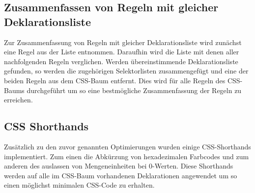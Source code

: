\subsection{Zusammenfassen von Regeln mit gleicher Deklarationsliste}
Zur Zusammenfassung von Regeln mit gleicher Deklarationsliste wird zunächst eine Regel aus der Liste entnommen. Daraufhin wird die Liste mit denen aller nachfolgenden Regeln verglichen. Werden übereinstimmende Deklarationsliste gefunden, so werden die zugehörigen Selektorlisten zusammengefügt und eine der beiden Regeln aus dem CSS-Baum entfernt.
Dies wird für alle Regeln des CSS-Baums durchgeführt um so eine bestmögliche Zusammenfassung der Regeln zu erreichen.

\subsection{CSS Shorthands}
Zusätzlich zu den zuvor genannten Optimierungen wurden einige CSS-Shorthands implementiert. Zum einen die Abkürzung von hexadezimalen Farbcodes und zum anderen des auslassen von Mengeneinheiten bei 0-Werten.
Diese Shorthands werden auf alle im CSS-Baum vorhandenen Deklarationen angewendet um so einen möglichst minimalen CSS-Code zu erhalten.

